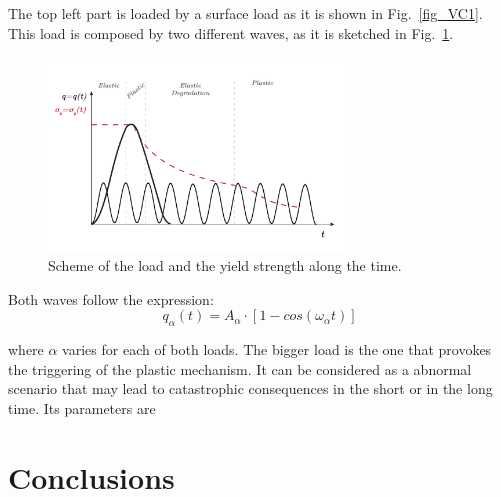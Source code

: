 \documentclass[applsci,journal,article,submit,moreauthors,pdftex]{Definitions/mdpi}
\begin{document}
The top left part is loaded by a surface load as it is shown in Fig.~\ref{fig_VC1}. This load is composed by two different waves, as it is sketched in Fig.~\ref{fig_VC2}.

\begin{figure}
\includegraphics[width=0.7\textwidth]{Figs/carga_VC.pdf}
\caption{Scheme of the load and the yield strength along the time.}
\label{fig_VC2}
\end{figure}

Both waves follow the expression:
$$
q_\alpha(t)=A_{\alpha}\cdot\left[1-cos(\omega_{\alpha}t)\right]
$$

where $\alpha$ varies for each of both loads. The bigger load is the one that provokes the triggering of the plastic mechanism. It can be considered as a abnormal scenario that may lead to catastrophic consequences in the short or in the long time. Its parameters are

\section{Conclusions}


\vspace{6pt} 



\end{document}
